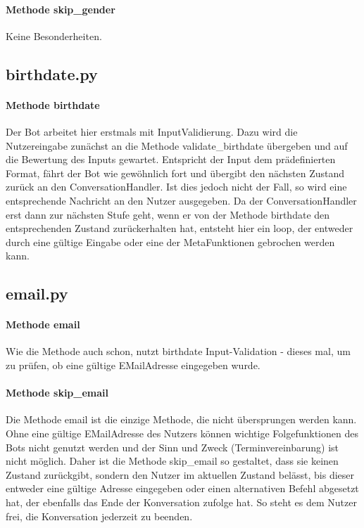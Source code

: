             \paragraph{Methode skip\_gender}
                Keine Besonderheiten. 
        

        \subsection{birthdate.py}
            \paragraph{Methode birthdate}
                Der Bot arbeitet hier erstmals mit Input\-Validierung. Dazu wird die Nutzereingabe zunächst an die Methode validate\_birthdate übergeben und auf die Bewertung des Inputs gewartet. Entspricht der Input dem prädefinierten Format, fährt der Bot wie gewöhnlich fort und übergibt den nächsten Zustand zurück an den ConversationHandler. Ist dies jedoch nicht der Fall, so wird eine entsprechende Nachricht an den Nutzer ausgegeben. Da der ConversationHandler erst dann zur nächsten Stufe geht, wenn er von der Methode birthdate den entsprechenden Zustand zurückerhalten hat, entsteht hier ein loop, der entweder durch eine gültige Eingabe oder eine der Meta\-Funktionen gebrochen werden kann.
        
        
        \subsection{email.py}
            \paragraph{Methode email}
                Wie die Methode auch schon, nutzt birthdate Input-Validation - dieses mal, um zu prüfen, ob eine gültige E\-Mail\-Adresse eingegeben wurde. 

            \paragraph{Methode skip\_email}
                Die Methode email ist die einzige Methode, die nicht übersprungen werden kann. Ohne eine gültige E\-Mail\-Adresse des Nutzers können wichtige Folgefunktionen des Bots nicht genutzt werden und der Sinn und Zweck (Terminvereinbarung) ist nicht möglich. Daher ist die Methode skip\_email so gestaltet, dass sie keinen Zustand zurückgibt, sondern den Nutzer im aktuellen Zustand belässt, bis dieser entweder eine gültige Adresse eingegeben oder einen alternativen Befehl abgesetzt hat, der ebenfalls das Ende der Konversation zufolge hat. So steht es dem Nutzer frei, die Konversation jederzeit zu beenden. 
        
